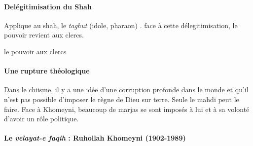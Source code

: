     
    \paragraph{Delégitimisation du Shah} Applique au shah, le \textit{taghut} (idole, pharaon) . face à cette délegitimisation,  le pouvoir revient aux clercs.
    \begin{Def}
    le pouvoir aux clercs
    \end{Def}
    
    \paragraph{Une rupture théologique} Dans le chiisme, il y a une idée d'une corruption profonde dans le monde et qu'il n'est pas possible d'imposer le règne de Dieu sur terre. Seule le mahdi peut le faire. Face à Khomeyni, beaucoup de marjas se sont imposés à lui et à sa volonté d'avoir un rôle politique.
    
    
    
    
\paragraph{Le \emph{velayat-e faqih} : Ruhollah Khomeyni (1902-1989)}



